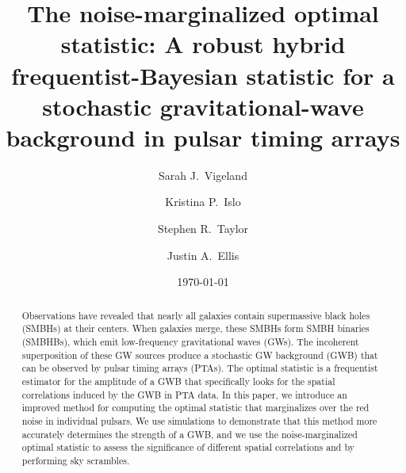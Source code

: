 \documentclass[twocolumn,aps,prd,superscriptaddress]{revtex4-1}
\begin{document}
\title{The noise-marginalized optimal statistic: A robust hybrid frequentist-Bayesian statistic for a stochastic gravitational-wave background in pulsar timing arrays}

\author{Sarah J.\ Vigeland}

\author{Kristina P.\ Islo}

\author{Stephen R.\ Taylor}

\author{Justin A.\ Ellis}


\date{\today}  

\begin{abstract}
Observations have revealed that nearly all galaxies 
contain supermassive black holes (SMBHs) at their centers. 
When galaxies merge, these SMBHs form SMBH binaries (SMBHBs), 
which emit low-frequency gravitational waves (GWs). 
The incoherent superposition of these GW sources produce a stochastic GW background (GWB) 
that can be observed by pulsar timing arrays (PTAs). 
The optimal statistic is a frequentist estimator for the amplitude of a GWB 
that specifically looks for the spatial correlations induced by the GWB in PTA data. 
In this paper, we introduce an improved method for computing the optimal statistic 
that marginalizes over the red noise in individual pulsars. 
We use simulations to demonstrate that this method 
more accurately determines the strength of a GWB, 
and we use the noise-marginalized optimal statistic to assess the 
significance of different spatial correlations and 
by performing sky scrambles.
\end{abstract}
\end{document}

